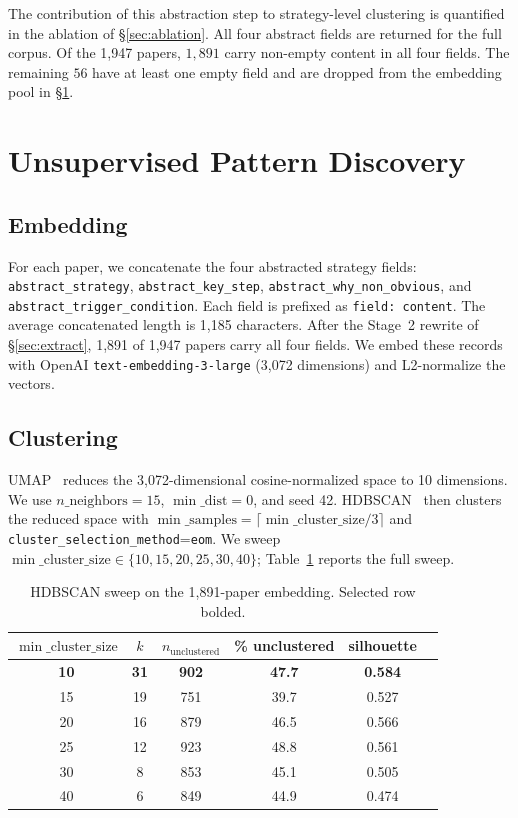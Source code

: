 \documentclass[10pt,a4paper]{article}
\begin{document}
The contribution of this abstraction step to strategy-level clustering is quantified in the ablation of \S\ref{sec:ablation}. All four abstract fields are returned for the full corpus. Of the 1{,}947 papers, $1{,}891$ carry non-empty content in all four fields. The remaining $56$ have at least one empty field and are dropped from the embedding pool in \S\ref{sec:clustering}.

\section{Unsupervised Pattern Discovery}
\label{sec:clustering}

\subsection{Embedding}

For each paper, we concatenate the four abstracted strategy fields: \texttt{abstract\_strategy}, \texttt{abstract\_key\_step}, \texttt{abstract\_why\_non\_obvious}, and \texttt{abstract\_trigger\_condition}. Each field is prefixed as \texttt{field: content}. The average concatenated length is 1{,}185 characters. After the Stage~2 rewrite of \S\ref{sec:extract}, 1{,}891 of 1{,}947 papers carry all four fields. We embed these records with OpenAI \texttt{text-embedding-3-large} (3{,}072 dimensions) and L2-normalize the vectors.

\subsection{Clustering}

UMAP~\cite{umap2018} reduces the 3{,}072-dimensional cosine-normalized space to 10 dimensions. We use $n\_\text{neighbors}{=}15$, $\min\_\text{dist}{=}0$, and seed 42. HDBSCAN~\cite{hdbscan2017} then clusters the reduced space with $\min\_\text{samples}{=}\lceil \min\_\text{cluster\_size}/3 \rceil$ and \texttt{cluster\_selection\_method}=\texttt{eom}. We sweep $\min\_\text{cluster\_size}\in\{10,15,20,25,30,40\}$; Table~\ref{tab:sweep} reports the full sweep.

\begin{table}[!htbp]
\centering
\caption{HDBSCAN sweep on the 1{,}891-paper embedding. Selected row bolded.}
\label{tab:sweep}
\small
\begin{tabular}{cccccc}
\toprule
$\min\_\text{cluster\_size}$ & $k$ & $n_\text{unclustered}$ & \% unclustered & silhouette \\
\midrule
\textbf{10} & \textbf{31} & \textbf{902} & \textbf{47.7} & \textbf{0.584} \\
15 & 19 & 751 & 39.7 & 0.527 \\
20 & 16 & 879 & 46.5 & 0.566 \\
25 & 12 & 923 & 48.8 & 0.561 \\
30 &  8 & 853 & 45.1 & 0.505 \\
40 &  6 & 849 & 44.9 & 0.474 \\
\bottomrule
\end{tabular}
\end{table}
\end{document}
